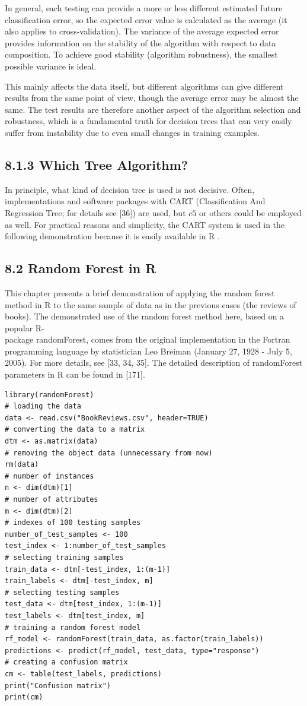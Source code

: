 \documentclass[10pt]{book}
\begin{document}
In general, each testing can provide a more or less different estimated future classification error, so the expected error value is calculated as the average (it also applies to cross-validation). The variance of the average expected error provides information on the stability of the algorithm with respect to data composition. To achieve good stability (algorithm robustness), the smallest possible variance is ideal.

This mainly affects the data itself, but different algorithms can give different results from the same point of view, though the average error may be almost the same. The test results are therefore another aspect of the algorithm selection and robustness, which is a fundamental truth for decision trees that can very easily suffer from instability due to even small changes in training examples.

\subsection*{8.1.3 Which Tree Algorithm?}
In principle, what kind of decision tree is used is not decisive. Often, implementations and software packages with CART (Classification And Regression Tree; for details see [36]) are used, but $c 5$ or others could be employed as well. For practical reasons and simplicity, the CART system is used in the following demonstration because it is easily available in R .

\subsection*{8.2 Random Forest in R}
This chapter presents a brief demonstration of applying the random forest method in R to the same sample of data as in the previous cases (the reviews of books). The demonstrated use of the random forest method here, based on a popular R-\\[0pt]
package randomForest, comes from the original implementation in the Fortran programming language by statistician Leo Breiman (January 27, 1928 - July 5, 2005). For more details, see [33, 34, 35]. The detailed description of randomForest parameters in R can be found in [171].

\begin{verbatim}
library(randomForest)
# loading the data
data <- read.csv("BookReviews.csv", header=TRUE)
# converting the data to a matrix
dtm <- as.matrix(data)
# removing the object data (unnecessary from now)
rm(data)
# number of instances
n <- dim(dtm)[1]
# number of attributes
m <- dim(dtm)[2]
# indexes of 100 testing samples
number_of_test_samples <- 100
test_index <- 1:number_of_test_samples
# selecting training samples
train_data <- dtm[-test_index, 1:(m-1)]
train_labels <- dtm[-test_index, m]
# selecting testing samples
test_data <- dtm[test_index, 1:(m-1)]
test_labels <- dtm[test_index, m]
# training a random forest model
rf_model <- randomForest(train_data, as.factor(train_labels))
predictions <- predict(rf_model, test_data, type="response")
# creating a confusion matrix
cm <- table(test_labels, predictions)
print("Confusion matrix")
print(cm)
\end{verbatim}
\end{document}
